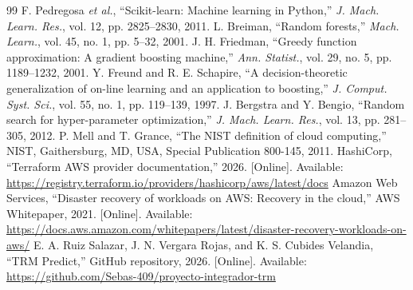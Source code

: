 \documentclass[conference]{IEEEtran}
\begin{document}
\begin{thebibliography}{99}
 F. Pedregosa \emph{et al.}, ``Scikit-learn: Machine learning in Python,'' \emph{J. Mach. Learn. Res.}, vol. 12, pp. 2825--2830, 2011.
 L. Breiman, ``Random forests,'' \emph{Mach. Learn.}, vol. 45, no. 1, pp. 5--32, 2001.
 J. H. Friedman, ``Greedy function approximation: A gradient boosting machine,'' \emph{Ann. Statist.}, vol. 29, no. 5, pp. 1189--1232, 2001.
 Y. Freund and R. E. Schapire, ``A decision-theoretic generalization of on-line learning and an application to boosting,'' \emph{J. Comput. Syst. Sci.}, vol. 55, no. 1, pp. 119--139, 1997.
 J. Bergstra and Y. Bengio, ``Random search for hyper-parameter optimization,'' \emph{J. Mach. Learn. Res.}, vol. 13, pp. 281--305, 2012.
 P. Mell and T. Grance, ``The NIST definition of cloud computing,'' NIST, Gaithersburg, MD, USA, Special Publication 800-145, 2011.
 HashiCorp, ``Terraform AWS provider documentation,'' 2026. [Online]. Available: \url{https://registry.terraform.io/providers/hashicorp/aws/latest/docs}
 Amazon Web Services, ``Disaster recovery of workloads on AWS: Recovery in the cloud,'' AWS Whitepaper, 2021. [Online]. Available: \url{https://docs.aws.amazon.com/whitepapers/latest/disaster-recovery-workloads-on-aws/}
 E. A. Ruiz Salazar, J. N. Vergara Rojas, and K. S. Cubides Velandia, ``TRM Predict,'' GitHub repository, 2026. [Online]. Available: \url{https://github.com/Sebas-409/proyecto-integrador-trm}
\end{thebibliography}
\end{document}

